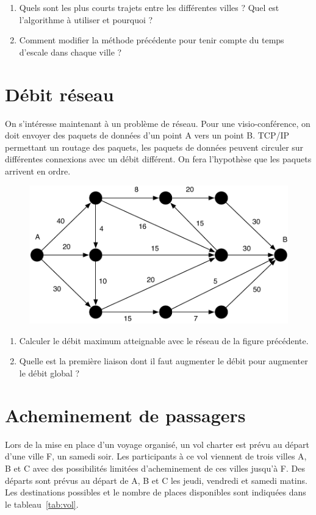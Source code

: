 \documentclass[paper=a4, fontsize=11pt]{scrartcl} %
\numberwithin{equation}{section} %
\numberwithin{figure}{section} %
\numberwithin{table}{section} %
\begin{document}
\begin{enumerate}
\item Quels sont les plus courts trajets entre les différentes villes ? Quel est l'algorithme à utiliser et pourquoi ?
\item Comment modifier la méthode précédente pour tenir compte du temps d'escale dans chaque ville ? 
\end{enumerate}
\section{Débit réseau}

On s'intéresse maintenant à un problème de réseau. Pour une visio-conférence, on doit envoyer des paquets de données d'un point A vers un point B. TCP/IP permettant un routage des paquets, les paquets de données peuvent circuler sur différentes connexions avec un débit différent. On fera l'hypothèse que les paquets arrivent en ordre. 

\begin{figure}[htbp]
\begin{center}
	\includegraphics[width=.8\textwidth]{graphe1.pdf}
\end{center}
\end{figure}

\begin{enumerate}
\item Calculer le débit maximum atteignable avec le réseau de la figure précédente.
\item Quelle est la première liaison dont il faut augmenter le débit pour augmenter le débit global ?
\end{enumerate}
\section{Acheminement de passagers}

Lors de la mise en place d'un voyage organisé, un vol charter est
prévu au départ d'une ville F, un samedi soir. Les participants à ce
vol viennent de trois villes A, B et C avec des possibilités limitées
d'acheminement de ces villes jusqu'à F. Des départs sont prévus au
départ de A, B et C les jeudi, vendredi et samedi matins. Les
destinations possibles et le nombre de places disponibles sont
indiquées dans le tableau~\ref{tab:vol}.
\end{document}
